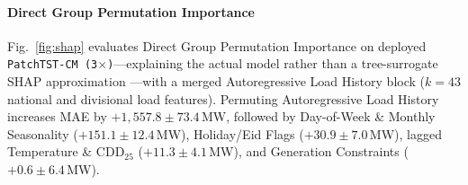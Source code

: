\documentclass[5p,twocolumn,authoryear]{elsarticle}
\begin{document}
\paragraph{Direct Group Permutation Importance}
Fig.~\ref{fig:shap} evaluates Direct Group Permutation Importance on deployed \texttt{PatchTST-CM (3$\times$)}---explaining the actual model rather than a tree-surrogate SHAP approximation \citep{lundberg2017shap}---with a merged Autoregressive Load History block ($k=43$ national and divisional load features). Permuting Autoregressive Load History increases MAE by $+1,557.8 \pm 73.4$\,MW, followed by Day-of-Week \& Monthly Seasonality ($+151.1 \pm 12.4$\,MW), Holiday/Eid Flags ($+30.9 \pm 7.0$\,MW), lagged Temperature \& $\text{CDD}_{25}$ ($+11.3 \pm 4.1$\,MW), and Generation Constraints ($+0.6 \pm 6.4$\,MW).

\begin{table}[t]
\centering
\caption{Architecture-dependent 5-seed feature and PCA ablation across \texttt{PatchTST-CM (3$\times$)}, \texttt{Equal-Weight RNN}, and \texttt{Ridge}, with paired $t$-test $p$-values vs. Base. 95\% PCA degrades \texttt{PatchTST-CM} and \texttt{Ridge} while leaving \texttt{Equal-Weight RNN} unchanged.}
\label{tab:ablation}
\end{table}
\end{document}
